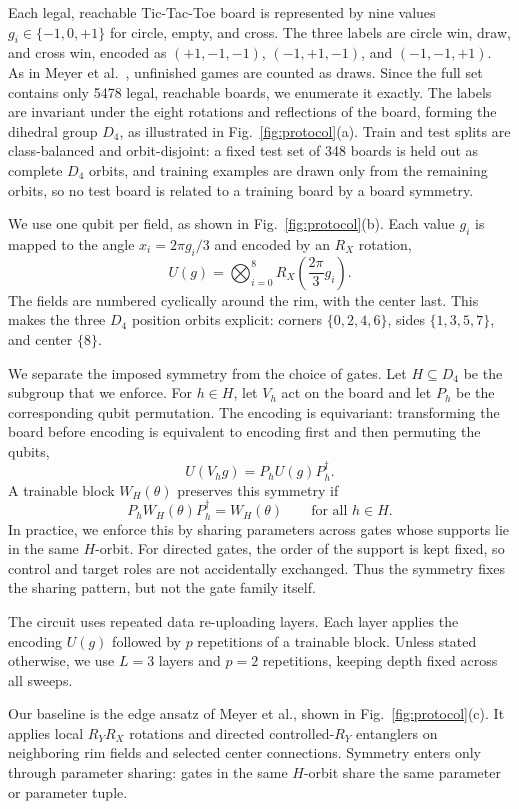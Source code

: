 Each legal, reachable Tic-Tac-Toe board is represented by
nine values $g_i\in\{-1,0,+1\}$ for circle, empty, and cross.
The three labels are circle win, draw, and cross win, encoded
as $(+1,-1,-1)$, $(-1,+1,-1)$, and $(-1,-1,+1)$. As in
Meyer et al.~\cite{meyer2023symmetry}, unfinished games are
counted as draws. Since the full set contains only 5478 legal,
reachable boards, we enumerate it exactly. The labels
are invariant under the eight rotations and reflections of the
board, forming the dihedral group $D_4$, as illustrated in
Fig.~\ref{fig:protocol}(a). Train and test splits
are class-balanced and orbit-disjoint: a fixed test set of 348
boards is held out as complete $D_4$ orbits, and training
examples are drawn only from the remaining orbits, so no test
board is related to a training board by a board symmetry.

We use one qubit per field, as shown in Fig.~\ref{fig:protocol}(b).
Each value $g_i$ is mapped to the angle $x_i=2\pi g_i/3$ and
encoded by an $R_X$ rotation,
\[
U(g)=\bigotimes_{i=0}^{8} R_X\!\left(\frac{2\pi}{3}g_i\right).
\]
The fields are numbered cyclically around the rim, with the
center last. This makes the three $D_4$ position orbits explicit:
corners $\{0,2,4,6\}$, sides $\{1,3,5,7\}$, and center $\{8\}$.

We separate the imposed symmetry from the choice of gates.
Let $H\subseteq D_4$ be the subgroup that we enforce. For
$h\in H$, let $V_h$ act on the board and let $P_h$ be the
corresponding qubit permutation. The encoding is equivariant:
transforming the board before encoding is equivalent to
encoding first and then permuting the qubits,
\[
U(V_h g)=P_h U(g) P_h^\dagger .
\]
A trainable block $W_H(\theta)$ preserves this symmetry if
\[
P_h W_H(\theta) P_h^\dagger = W_H(\theta)
\qquad \text{for all } h\in H .
\]
In practice, we enforce this by sharing parameters across gates
whose supports lie in the same $H$-orbit. For directed gates,
the order of the support is kept fixed, so control and target
roles are not accidentally exchanged. Thus the symmetry fixes
the sharing pattern, but not the gate family itself.

The circuit uses repeated data re-uploading layers. Each layer
applies the encoding $U(g)$ followed by $p$ repetitions of a
trainable block. Unless stated otherwise, we use $L=3$ layers
and $p=2$ repetitions, keeping depth fixed across all sweeps.

Our baseline is the edge ansatz of Meyer et al.,
shown in Fig.~\ref{fig:protocol}(c). It applies local $R_YR_X$
rotations and directed controlled-$R_Y$ entanglers on neighboring
rim fields and selected center connections. Symmetry enters only
through parameter sharing: gates in the same $H$-orbit share the
same parameter or parameter tuple.

